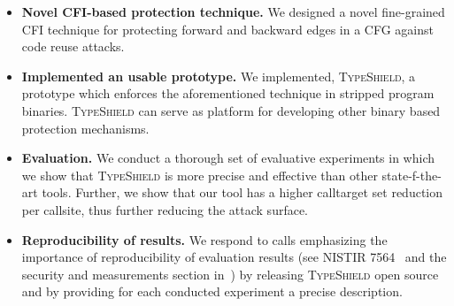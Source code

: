 %  
%  

\label{Contribution}
\begin{itemize}

 \item \textbf{Novel CFI-based protection technique.} We designed a novel fine-grained CFI technique for protecting forward and backward edges in a CFG
 against code reuse attacks.
 
 \item \textbf{Implemented an usable prototype.} We implemented, \textsc{TypeShield}, a prototype which enforces the aforementioned technique
 in stripped program binaries. \textsc{TypeShield} can serve as platform for developing other binary based protection mechanisms.
 
 \item \textbf{Evaluation.} We conduct a thorough set of evaluative experiments in which we show that \textsc{TypeShield} is more precise and effective than 
 other state-f-the-art tools. Further, we show that our tool has a higher calltarget set reduction per callsite, thus further reducing the attack surface.
 
 \item \textbf{Reproducibility of results.} 
 We respond to calls emphasizing the importance of reproducibility of evaluation results (see NISTIR 7564~\cite{reprod:nist} and the security and measurements 
 section in~\cite{herley:security}) by releasing \textsc{TypeShield} open source and by providing for each conducted experiment a precise description.
 
\end{itemize}


